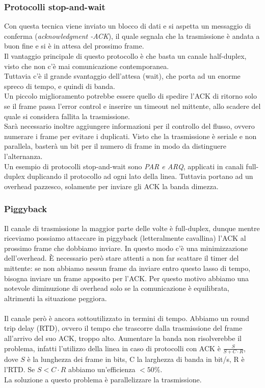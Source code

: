 \documentclass[10pt,a4paper,twoside]{article}
\begin{document}
\subsubsection{Protocolli stop-and-wait}
Con questa tecnica viene inviato un blocco di dati e si aspetta un messaggio di conferma (\textit{acknowledgment -ACK}), il quale segnala che la trasmissione è andata a buon fine e si è in attesa del prossimo frame.\\
Il vantaggio principale di questo protocollo è che basta un canale half-duplex, visto che non c'è mai comunicazione contemporanea.\\Tuttavia c'è il grande svantaggio dell'attesa (wait), che porta ad un enorme spreco di tempo, e quindi di banda.\\
Un piccolo miglioramento potrebbe essere quello di spedire l'ACK di ritorno solo se il frame passa l'error control e inserire un timeout nel mittente, allo scadere del quale si considera fallita la trasmissione.\\
Sarà necessario inoltre aggiungere informazioni per il controllo del flusso, ovvero numerare i frame per evitare i duplicati. Visto che la trasmissione è seriale e non parallela, basterà un bit per il numero di frame in modo da distinguere l'alternanza.\\
Un esempio di protocolli stop-and-wait sono \textit{PAR e ARQ}, applicati in canali full-duplex duplicando il protocollo ad ogni lato della linea. Tuttavia portano ad un overhead pazzesco, solamente per inviare gli ACK la banda dimezza.

\subsubsection{Piggyback}
Il canale di trasmissione la maggior parte delle volte è full-duplex, dunque mentre riceviamo possiamo attaccare in piggyback (letteralmente cavallina) l'ACK al prossimo frame che dobbiamo inviare. In questo modo c'è una minimizzazione dell'overhead. È necessario però stare attenti a non far scattare il timer del mittente: se non abbiamo nessun frame da inviare entro questo lasso di tempo, bisogna inviare un frame apposito per l'ACK. Per questo motivo abbiamo una notevole diminuzione di overhead solo se la comunicazione è equilibrata, altrimenti la situazione peggiora.\\\\
Il canale però è ancora sottoutilizzato in termini di tempo. Abbiamo un round trip delay (RTD), ovvero il tempo che trascorre dalla trasmissione del frame all'arrivo del suo ACK, troppo alto. Aumentare la banda non risolverebbe il problema, infatti l'utilizzo della linea in caso di protocolli con ACK è $\frac{S}{S+C\cdot R}$, dove $S$ è la lunghezza dei frame in bits, C la larghezza di banda in bit/s, R è l'RTD. Se $S<C\cdot R$ abbiamo un'efficienza $<50\%$.\\
La soluzione a questo problema è parallelizzare la trasmissione.
\end{document}
